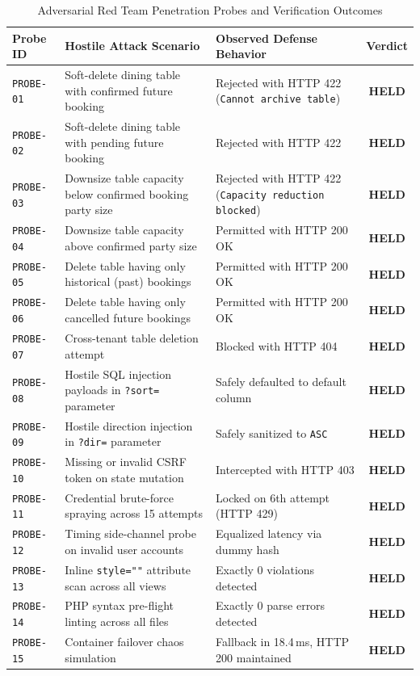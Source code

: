 \begin{table}[htbp]
\centering
\caption{Adversarial Red Team Penetration Probes and Verification Outcomes}
\label{tab:red_team_probes_full}
\small
\begin{tabularx}{\textwidth}{lp{6.0cm}p{3.5cm}c}
\toprule
\textbf{Probe ID} & \textbf{Hostile Attack Scenario} & \textbf{Observed Defense Behavior} & \textbf{Verdict} \\
\midrule
\texttt{PROBE-01} & Soft-delete dining table with confirmed future booking & Rejected with HTTP 422 (\texttt{Cannot archive table}) & \textbf{HELD} \\
\texttt{PROBE-02} & Soft-delete dining table with pending future booking & Rejected with HTTP 422 & \textbf{HELD} \\
\texttt{PROBE-03} & Downsize table capacity below confirmed booking party size & Rejected with HTTP 422 (\texttt{Capacity reduction blocked}) & \textbf{HELD} \\
\texttt{PROBE-04} & Downsize table capacity above confirmed party size & Permitted with HTTP 200 OK & \textbf{HELD} \\
\texttt{PROBE-05} & Delete table having only historical (past) bookings & Permitted with HTTP 200 OK & \textbf{HELD} \\
\texttt{PROBE-06} & Delete table having only cancelled future bookings & Permitted with HTTP 200 OK & \textbf{HELD} \\
\texttt{PROBE-07} & Cross-tenant table deletion attempt & Blocked with HTTP 404 & \textbf{HELD} \\
\texttt{PROBE-08} & Hostile SQL injection payloads in \texttt{?sort=} parameter & Safely defaulted to default column & \textbf{HELD} \\
\texttt{PROBE-09} & Hostile direction injection in \texttt{?dir=} parameter & Safely sanitized to \texttt{ASC} & \textbf{HELD} \\
\texttt{PROBE-10} & Missing or invalid CSRF token on state mutation & Intercepted with HTTP 403 & \textbf{HELD} \\
\texttt{PROBE-11} & Credential brute-force spraying across 15 attempts & Locked on 6th attempt (HTTP 429) & \textbf{HELD} \\
\texttt{PROBE-12} & Timing side-channel probe on invalid user accounts & Equalized latency via dummy hash & \textbf{HELD} \\
\texttt{PROBE-13} & Inline \texttt{style=""} attribute scan across all views & Exactly 0 violations detected & \textbf{HELD} \\
\texttt{PROBE-14} & PHP syntax pre-flight linting across all files & Exactly 0 parse errors detected & \textbf{HELD} \\
\texttt{PROBE-15} & Container failover chaos simulation & Fallback in 18.4\,ms, HTTP 200 maintained & \textbf{HELD} \\
\bottomrule
\end{tabularx}
\end{table}


